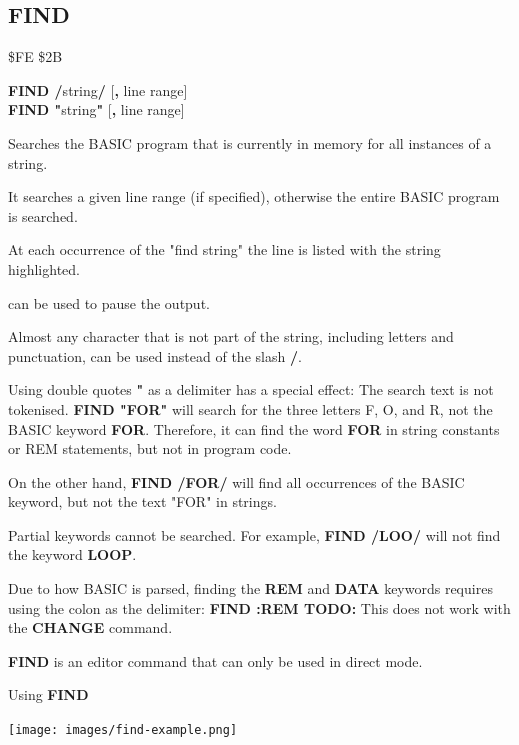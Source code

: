 \subsection{FIND}
\begin{description}[leftmargin=2cm,style=nextline]
\item [Token:] \$FE \$2B
\item [Format:] {\bf FIND /}string{\bf/} [{\bf,} line range] \\
		{\bf FIND "}string{\bf"} [{\bf,} line range]
\item [Usage:]  Searches the BASIC program that is currently in memory for all
                instances of a string.

                It searches a given line range
                (if specified), otherwise the entire BASIC program is searched.

                At each occurrence of the "find string" the line is
                listed with the string highlighted.

                 can be used to pause the output.

\item [Remarks:] Almost any character that is not part of the string,
                 including letters and punctuation, can be used instead of the
                 slash {\bf /}.

                 Using double quotes {\bf "} as a delimiter has a special effect:
                 The search text is not tokenised.
                 {\bf FIND "FOR"} will search for the three letters F, O, and R, not
                 the BASIC keyword {\bf FOR}. Therefore, it can find the word
                 {\bf FOR} in string constants or REM statements, but not
                 in program code.

                 On the other hand, {\bf FIND /FOR/} will find all occurrences of
                 the BASIC keyword, but not the text "FOR" in strings.

                 Partial keywords cannot be searched. For example,
                 {\bf FIND /LOO/} will not find the keyword {\bf LOOP}.

                 Due to how BASIC is parsed, finding the {\bf REM} and {\bf DATA}
                 keywords requires using the colon as the delimiter: {\bf FIND :REM TODO:}
                 This does not work with the {\bf CHANGE} command.

                 {\bf FIND} is an editor command that can only be used
                in direct mode.

\item [Example:] Using {\bf FIND}
\item \begin{center}\texttt{[image: images/find-example.png]}\end{center}
\end{description}

